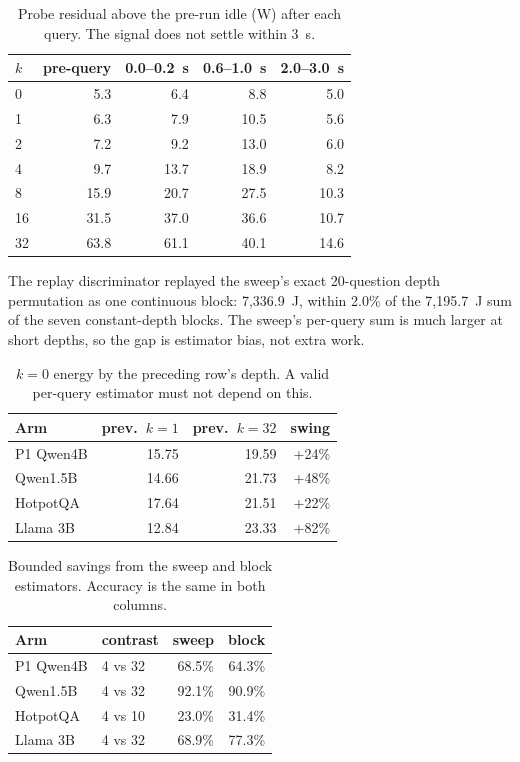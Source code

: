 \documentclass[a4paper,fleqn]{cas-sc}
\begin{document}
\begin{table}[pos=htbp]
  \centering
  \caption{Probe residual above the pre-run idle (W) after each query. The signal does not settle within 3~s.}
  \label{tab:s5bprobe}
  \footnotesize
  \begin{tabular}{@{}lrrrr@{}}
    \toprule
    $k$ & pre-query & 0.0--0.2~s & 0.6--1.0~s & 2.0--3.0~s \\
    \midrule
    0 & 5.3 & 6.4 & 8.8 & 5.0 \\
    1 & 6.3 & 7.9 & 10.5 & 5.6 \\
    2 & 7.2 & 9.2 & 13.0 & 6.0 \\
    4 & 9.7 & 13.7 & 18.9 & 8.2 \\
    8 & 15.9 & 20.7 & 27.5 & 10.3 \\
    16 & 31.5 & 37.0 & 36.6 & 10.7 \\
    32 & 63.8 & 61.1 & 40.1 & 14.6 \\
    \bottomrule
  \end{tabular}
\end{table}

The replay discriminator replayed the sweep's exact 20-question depth permutation
as one continuous block: 7{,}336.9~J, within 2.0\% of the 7{,}195.7~J sum of the
seven constant-depth blocks. The sweep's per-query sum is much larger at short
depths, so the gap is estimator bias, not extra work.

\begin{table}[pos=htbp]
  \centering
  \caption{$k=0$ energy by the preceding row's depth. A valid per-query estimator must not depend on this.}
  \label{tab:s5bneighbour}
  \footnotesize
  \begin{tabular}{@{}lrrr@{}}
    \toprule
    Arm & prev.\ $k=1$ & prev.\ $k=32$ & swing \\
    \midrule
    P1 Qwen4B & 15.75 & 19.59 & +24\% \\
    Qwen1.5B & 14.66 & 21.73 & +48\% \\
    HotpotQA & 17.64 & 21.51 & +22\% \\
    Llama 3B & 12.84 & 23.33 & +82\% \\
    \bottomrule
  \end{tabular}
\end{table}

\begin{table}[pos=htbp]
  \centering
  \caption{Bounded savings from the sweep and block estimators. Accuracy is the same in both columns.}
  \label{tab:s5bbounded}
  \footnotesize
  \begin{tabular}{@{}llrr@{}}
    \toprule
    Arm & contrast & sweep & block \\
    \midrule
    P1 Qwen4B & 4 vs 32 & 68.5\% & 64.3\% \\
    Qwen1.5B & 4 vs 32 & 92.1\% & 90.9\% \\
    HotpotQA & 4 vs 10 & 23.0\% & 31.4\% \\
    Llama 3B & 4 vs 32 & 68.9\% & 77.3\% \\
    \bottomrule
  \end{tabular}
\end{table}
\end{document}
